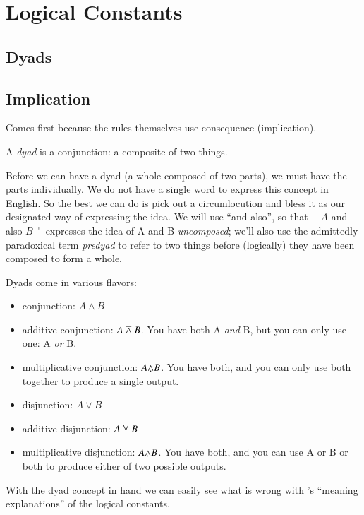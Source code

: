 \section{Logical Constants}\label{sec:logconsts}

\subsection{Dyads}

\subsection{Implication}

Comes first because the rules themselves use consequence (implication).

A \textit{dyad} is a conjunction: a composite of two things.

Before we can have a dyad (a whole composed of two parts), we must
have the parts individually. We do not have a single word to express
this concept in English. So the best we can do is pick out a
circumlocution and bless it as our designated way of expressing the
idea. We will use ``and also'', so that \(\ulcorner A\) and also
\(B\urcorner\) expresses the idea of A and B \textit{uncomposed};
we'll also use the admittedly paradoxical term \textit{predyad} to
refer to two things before (logically) they have been composed to form
a whole.

Dyads come in various flavors:

\begin{itemize}
\item conjunction: \(A\land B\)
\item additive conjunction: \(A \barwedge B\). You have both A
  \textit{and} B, but you can only use one: A \textit{or} B.
\item multiplicative conjunction: \(A\fusion B\). You have both, and
  you can only use both together to produce a single output.
\item disjunction: \(A\lor B\)
\item additive disjunction: \(A \veebar B\)
\item multiplicative disjunction: \(A\fusion B\). You have both, and
  you can use A or B or both to produce either of two possible outputs.
\end{itemize}

With the dyad concept in hand we can easily see what is wrong with
\ML's ``meaning explanations'' of the logical constants.

